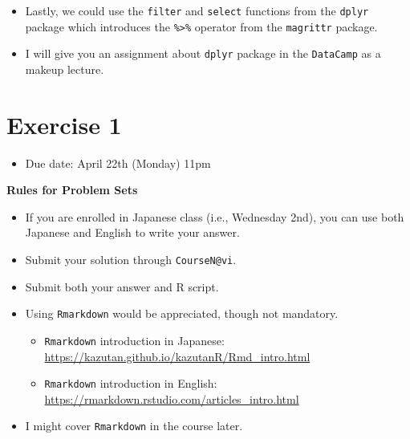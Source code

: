 \documentclass[]{book}
\newenvironment{Shaded}{\begin{snugshade}}{\end{snugshade}}
\newcommand{\DecValTok}[1]{\textcolor[rgb]{0.00,0.00,0.81}{#1}}
\newcommand{\KeywordTok}[1]{\textcolor[rgb]{0.13,0.29,0.53}{\textbf{#1}}}
\newcommand{\NormalTok}[1]{#1}
\newcommand{\OperatorTok}[1]{\textcolor[rgb]{0.81,0.36,0.00}{\textbf{#1}}}
\newcommand{\StringTok}[1]{\textcolor[rgb]{0.31,0.60,0.02}{#1}}
\providecommand{\tightlist}{%
  \setlength{\itemsep}{0pt}\setlength{\parskip}{0pt}}
\begin{document}
\begin{itemize}
\tightlist
\item
  Lastly, we could use the \texttt{filter} and \texttt{select} functions from the \texttt{dplyr} package which introduces the \texttt{\%\textgreater{}\%} operator from the \texttt{magrittr} package.
\end{itemize}

\begin{Shaded}
\end{Shaded}

\begin{itemize}
\tightlist
\item
  I will give you an assignment about \texttt{dplyr} package in the \texttt{DataCamp} as a makeup lecture.
\end{itemize}

\hypertarget{exercise-1}{%
\chapter{Exercise 1}\label{exercise-1}}

\begin{itemize}
\tightlist
\item
  Due date: April 22th (Monday) 11pm
\end{itemize}

\textbf{Rules for Problem Sets}

\begin{itemize}
\tightlist
\item
  If you are enrolled in Japanese class (i.e., Wednesday 2nd), you can use both Japanese and English to write your answer.
\item
  Submit your solution through \texttt{CourseN@vi}.
\item
  Submit both your answer and R script.
\item
  Using \texttt{Rmarkdown} would be appreciated, though not mandatory.

  \begin{itemize}
  \tightlist
  \item
    \texttt{Rmarkdown} introduction in Japanese: \url{https://kazutan.github.io/kazutanR/Rmd_intro.html}
  \item
    \texttt{Rmarkdown} introduction in English: \url{https://rmarkdown.rstudio.com/articles_intro.html}
  \end{itemize}
\item
  I might cover \texttt{Rmarkdown} in the course later.
\end{itemize}
\end{document}
